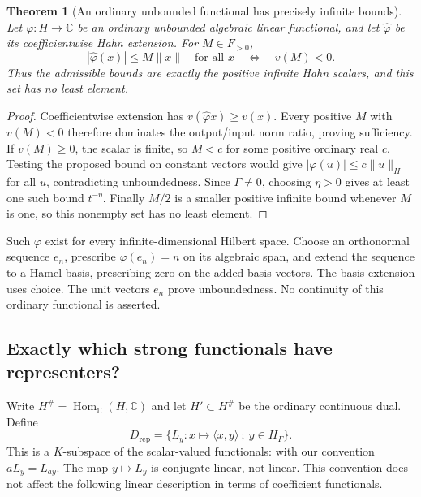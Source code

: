 \documentclass[11pt,letterpaper]{article}
\numberwithin{equation}{section}
\newtheorem{theorem}{Theorem}[section]
\theoremstyle{definition}
\theoremstyle{remark}
\newcommand{\C}{\mathbb C}
\newcommand{\HG}{H_\Gamma}
\newcommand{\Hom}{\operatorname{Hom}}
\newcommand{\Drep}{D_{\mathrm{rep}}}
\newcommand{\norm}[1]{\lVert#1\rVert}
\newcommand{\ip}[2]{\langle#1,#2\rangle}
\begin{document}
\begin{theorem}[An ordinary unbounded functional has precisely infinite bounds]
\label{duals:thm:infinite-bounds}
Let $\varphi:H\to\C$ be an ordinary unbounded algebraic linear
functional, and let $\widehat\varphi$ be its coefficientwise Hahn
extension. For $M\in F_{>0}$,
\[
 |\widehat\varphi(x)|\le M\norm{x}\quad\text{for all }x
 \quad\Longleftrightarrow\quad v(M)<0.
\]
Thus the admissible bounds are exactly the positive infinite Hahn
scalars, and this set has no least element.
\end{theorem}
\begin{proof}
Coefficientwise extension has $v(\widehat\varphi x)\ge v(x)$.
Every positive $M$ with $v(M)<0$ therefore dominates the output/input
norm ratio, proving sufficiency.
If $v(M)\ge0$, the scalar is finite, so $M<c$ for some positive
ordinary real $c$. Testing the proposed bound on constant vectors would
give $|\varphi(u)|\le c\norm{u}_H$ for all $u$, contradicting
unboundedness. Since $\Gamma\ne0$, choosing $\eta>0$ gives at least one such
bound $t^{-\eta}$. Finally $M/2$ is a smaller positive infinite bound
whenever $M$ is one, so this nonempty set has no least element.
\end{proof}

Such $\varphi$ exist for every infinite-dimensional Hilbert space.
Choose an orthonormal sequence $e_n$, prescribe $\varphi(e_n)=n$ on
its algebraic span, and extend the sequence to a Hamel basis, prescribing
zero on the added basis vectors. The basis extension uses choice. The
unit vectors $e_n$ prove unboundedness. No continuity of this ordinary
functional is asserted.

\subsection{Exactly which strong functionals have representers?}
Write $H^\#=\Hom_\C(H,\C)$ and let $H'\subset H^\#$ be the ordinary
continuous dual. Define
\[
 \Drep=\{L_y:x\mapsto\ip{x}{y}\ ;\ y\in\HG\}.
\]
This is a $K$-subspace of the scalar-valued functionals: with our
convention $aL_y=L_{\bar a y}$. The map $y\mapsto L_y$ is conjugate
linear, not linear. This convention does not affect the following
linear description in terms of coefficient functionals.
\end{document}
